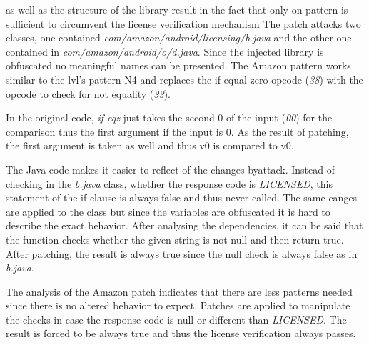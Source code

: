  as well as the structure of the library result in the fact that only on pattern is sufficient to circumvent the license verification mechanism
The patch attacks two classes, one contained \textit{com/amazon/android/licensing/b.java} and the other one contained in \textit{com/amazon/android/o/d.java}.
Since the injected library is obfuscated no meaningful names can be presented.
\newline
The Amazon pattern works similar to the \gls{lvl}'s pattern N4 and replaces the if equal zero opcode (\textit{38}) with the opcode to check for not equality (\textit{33}).
\newline

In the original code, \textit{if-eqz} just takes the second 0 of the input (\textit{00}) for the comparison thus the first argument if the input is 0.
As the result of patching, the first argument is taken as well and thus v0 is compared to v0.

The Java code makes it easier to reflect of the changes byattack.
Instead of checking in the \textit{b.java} class, whether the response code is \textit{LICENSED}, this statement of the if clause is always false and thus never called.
The same canges are applied to the  class but since the variables are obfuscated it is hard to describe the exact behavior.
After analysing the dependencies, it can be said that the function checks whether the given string is not null and then return true.
After patching, the result is always true since the null check is always false as in \textit{b.java}.
\newline


The analysis of the Amazon patch indicates that there are less patterns needed since there is no altered behavior to expect.
Patches are applied to manipulate the checks in case the response code is null or different than \textit{LICENSED}.
The result is forced to be always true and thus the license verification always passes.


